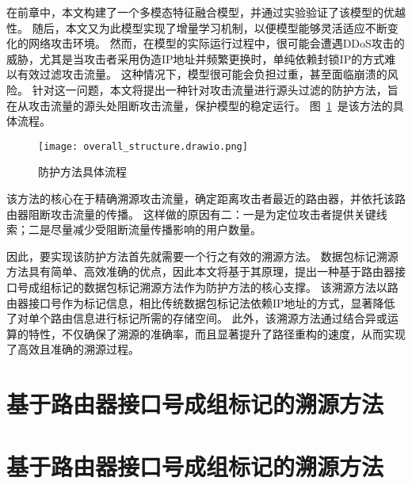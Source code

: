 在前章中，本文构建了一个多模态特征融合模型，并通过实验验证了该模型的优越性。
随后，本文又为此模型实现了增量学习机制，以便模型能够灵活适应不断变化的网络攻击环境。
然而，在模型的实际运行过程中，很可能会遭遇DDoS攻击的威胁，尤其是当攻击者采用伪造IP地址并频繁更换时，单纯依赖封锁IP的方式难以有效过滤攻击流量。
这种情况下，模型很可能会负担过重，甚至面临崩溃的风险。
针对这一问题，本文将提出一种针对攻击流量进行源头过滤的防护方法，旨在从攻击流量的源头处阻断攻击流量，保护模型的稳定运行。
图~\ref{fig:overall_structure}~是该方法的具体流程。
\begin{figure}[h]
	\centering
	\texttt{[image: overall\_structure.drawio.png]}
	\caption{防护方法具体流程}
	\label{fig:overall_structure}
\end{figure}
该方法的核心在于精确溯源攻击流量，确定距离攻击者最近的路由器，并依托该路由器阻断攻击流量的传播。
这样做的原因有二：一是为定位攻击者提供关键线索；二是尽量减少受阻断流量传播影响的用户数量。\par

因此，要实现该防护方法首先就需要一个行之有效的溯源方法。
数据包标记溯源方法具有简单、高效准确的优点，因此本文将基于其原理，提出一种基于路由器接口号成组标记的数据包标记溯源方法作为防护方法的核心支撑。
该溯源方法以路由器接口号作为标记信息，相比传统数据包标记法依赖IP地址的方式，显著降低了对单个路由信息进行标记所需的存储空间。
此外，该溯源方法通过结合异或运算的特性，不仅确保了溯源的准确率，而且显著提升了路径重构的速度，从而实现了高效且准确的溯源过程。

\section{基于路由器接口号成组标记的溯源方法}
\section{基于路由器接口号成组标记的溯源方法}


